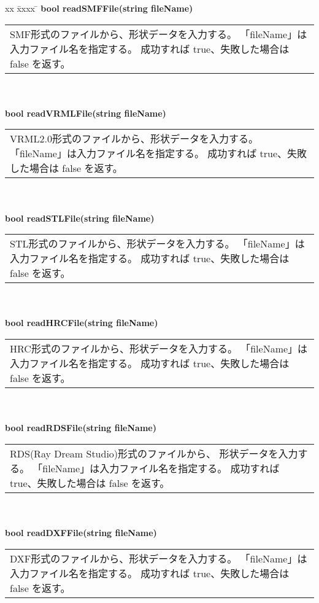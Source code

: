 \begin{tabbing}
xx \= xxxx \= \kill
\> \textbf{bool readSMFFile(string fileName)} \\
	\> \> \begin{tabular}{p{15cm}}
		SMF形式のファイルから、形状データを入力する。
		「fileName」は入力ファイル名を指定する。
		成功すれば true、失敗した場合は false を返す。
	\end{tabular} \\ \\

\> \textbf{bool readVRMLFile(string fileName)} \\
	\> \> \begin{tabular}{p{15cm}}
		VRML2.0形式のファイルから、形状データを入力する。
		「fileName」は入力ファイル名を指定する。
		成功すれば true、失敗した場合は false を返す。
	\end{tabular} \\ \\

\> \textbf{bool readSTLFile(string fileName)} \\
	\> \> \begin{tabular}{p{15cm}}
		STL形式のファイルから、形状データを入力する。
		「fileName」は入力ファイル名を指定する。
		成功すれば true、失敗した場合は false を返す。
	\end{tabular} \\ \\

\> \textbf{bool readHRCFile(string fileName)} \\
	\> \> \begin{tabular}{p{15cm}}
		HRC形式のファイルから、形状データを入力する。
		「fileName」は入力ファイル名を指定する。
		成功すれば true、失敗した場合は false を返す。
	\end{tabular} \\ \\

\> \textbf{bool readRDSFile(string fileName)} \\
	\> \> \begin{tabular}{p{15cm}}
		RDS(Ray Dream Studio)形式のファイルから、
		形状データを入力する。
		「fileName」は入力ファイル名を指定する。
		成功すれば true、失敗した場合は false を返す。
	\end{tabular} \\ \\

\> \textbf{bool readDXFFile(string fileName)} \\
	\> \> \begin{tabular}{p{15cm}}
		DXF形式のファイルから、形状データを入力する。
		「fileName」は入力ファイル名を指定する。
		成功すれば true、失敗した場合は false を返す。
	\end{tabular} \\ \\


\end{tabbing}
